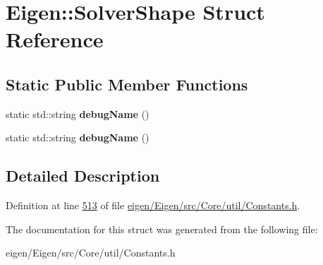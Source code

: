 \hypertarget{struct_eigen_1_1_solver_shape}{}\section{Eigen\+:\+:Solver\+Shape Struct Reference}
\label{struct_eigen_1_1_solver_shape}
\subsection*{Static Public Member Functions}
\begin{DoxyCompactItemize}
\item 
\mbox{\label{struct_eigen_1_1_solver_shape_acd3248dd8fe855f8836b6a1f8e930303}} 
static std\+::string {\bfseries debug\+Name} ()
\item 
\mbox{\label{struct_eigen_1_1_solver_shape_acd3248dd8fe855f8836b6a1f8e930303}} 
static std\+::string {\bfseries debug\+Name} ()
\end{DoxyCompactItemize}


\subsection{Detailed Description}


Definition at line \hyperlink{eigen_2_eigen_2src_2_core_2util_2_constants_8h_source_l00513}{513} of file \hyperlink{eigen_2_eigen_2src_2_core_2util_2_constants_8h_source}{eigen/\+Eigen/src/\+Core/util/\+Constants.\+h}.



The documentation for this struct was generated from the following file\+:\begin{DoxyCompactItemize}
\item 
eigen/\+Eigen/src/\+Core/util/\+Constants.\+h\end{DoxyCompactItemize}
